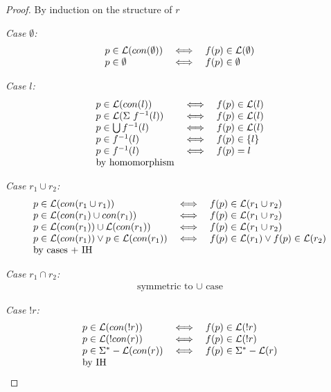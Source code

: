 \documentclass[twocolumn]{sig-alternate-10pt}
\begin{document}
\begin{proof}
By induction on the structure of $r$

\emph{Case $\emptyset$:}
  \[ \begin{array}{lll}
    p \in \mathcal{L}(con(\emptyset)) &\iff& f(p) \in \mathcal{L}(\emptyset) \\
    p \in \emptyset &\iff& f(p) \in \emptyset \\
  \end{array} \]

\emph{Case $l$:}
  \[ \begin{array}{lll}
    p \in \mathcal{L}(con(l)) &\iff& f(p) \in \mathcal{L}(l) \\
    p \in \mathcal{L}(\Sigma ~ f^{-1}(l)) &\iff& f(p) \in \mathcal{L}(l) \\
    p \in \bigcup f^{-1}(l) &\iff& f(p) \in \mathcal{L}(l) \\
    p \in f^{-1}(l) &\iff& f(p) \in \{ l \} \\
    p \in f^{-1}(l) &\iff& f(p) = l \\
    \text{by homomorphism} & & \\
  \end{array} \]

\emph{Case $r_1 \cup r_2$:}
  \[ \begin{array}{lll}
    p \in \mathcal{L}(con(r_1 \cup r_1)) &\iff& f(p) \in \mathcal{L}(r_1 \cup r_2) \\
    p \in \mathcal{L}(con(r_1) \cup con(r_1)) &\iff& f(p) \in \mathcal{L}(r_1 \cup r_2) \\
    p \in \mathcal{L}(con(r_1)) \cup \mathcal{L}(con(r_1)) &\iff& f(p) \in \mathcal{L}(r_1 \cup r_2) \\
    p \in \mathcal{L}(con(r_1)) \vee p \in \mathcal{L}(con(r_1)) 
       &\iff& 
       f(p) \in \mathcal{L}(r_1) \vee f(p) \in \mathcal{L}(r_2) \\
    \text{by cases + IH} & & \\
  \end{array} \]

\emph{Case $r_1 \cap r_2$:} 
  \[ \begin{array}{c}
    \text{symmetric to } \cup \text{ case}
  \end{array} \]

\emph{Case $!r$:}
  \[ \begin{array}{lll}
    p \in \mathcal{L}(con(!r)) &\iff& f(p) \in \mathcal{L}(!r) \\
    p \in \mathcal{L}(!con(r)) &\iff& f(p) \in \mathcal{L}(!r) \\
    p \in \Sigma^* - \mathcal{L}(con(r)) &\iff& f(p) \in \Sigma^* - \mathcal{L}(r) \\
    \text{by IH} & & \\
  \end{array} \]


\end{proof}
\end{document}
